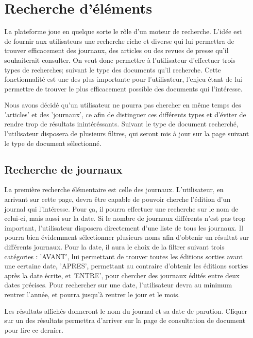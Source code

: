 \section{Recherche d'éléments}
\label{sec:recherche}

La plateforme joue en quelque sorte le rôle d'un moteur de recherche. L'idée est de fournir aux utilisateurs une recherche riche et diverse qui lui permettra de trouver efficacement des journaux, des articles ou des revues de presse qu'il souhaiterait consulter. On veut donc permettre à l'utilisateur d'effectuer trois types de recherches; suivant le type des documents qu'il recherche. Cette fonctionnalité est une des plus importante pour l'utilisateur, l'enjeu étant de lui permettre de trouver le plus efficacement possible des documents qui l'intéresse.

Nous avons décidé qu'un utilisateur ne pourra pas chercher en même temps des 'articles' et des 'journaux', ce afin de distinguer ces différents types et d'éviter de rendre trop de résultats inintéréssants. Suivant le type de document recherché, l'utilisateur disposera de plusieurs filtres, qui seront mis à jour sur la page suivant le type de document sélectionné.


\subsection{Recherche de journaux}
\label{sec:recherche_journal}

La première recherche élémentaire est celle des journaux. L'utilisateur, en arrivant sur cette page, devra être capable de pouvoir cherche l'édition d'un journal qui l'intéresse. Pour ça, il pourra effectuer une recherche sur le nom de celui-ci, mais aussi sur la date. Si le nombre de journaux différents n'est pas trop important, l'utilisateur disposera directement d'une liste de tous les journaux. Il pourra bien évidemment sélectionner plusieurs noms afin d'obtenir un résultat sur différents journaux. Pour la date, il aura le choix de la filtrer suivant trois catégories : 'AVANT', lui permettant de trouver toutes les éditions sorties avant une certaine date, 'APRES', permettant au contraire d'obtenir les éditions sorties après la date écrite, et 'ENTRE', pour chercher des journaux édités entre deux dates précises. Pour rechercher sur une date, l'utilisateur devra au minimum rentrer l'année, et pourra jusqu'à rentrer le jour et le mois.

Les résultats affichés donneront le nom du journal et sa date de parution. Cliquer sur un des résultats permettra d'arriver sur la page de consultation de document pour lire ce dernier.

